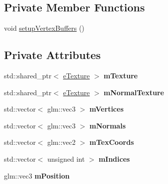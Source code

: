 \subsection*{Private Member Functions}
\begin{DoxyCompactItemize}
\item 
void \hyperlink{class_patch_a707359ae572413835eed30aa581b4303}{setup\+Vertex\+Buffers} ()
\end{DoxyCompactItemize}
\subsection*{Private Attributes}
\begin{DoxyCompactItemize}
\item 
std\+::shared\+\_\+ptr$<$ \hyperlink{classe_texture}{e\+Texture} $>$ {\bfseries m\+Texture}\hypertarget{class_patch_a448c010ef227400a0c920eba2ceaaa6a}{}\label{class_patch_a448c010ef227400a0c920eba2ceaaa6a}

\item 
std\+::shared\+\_\+ptr$<$ \hyperlink{classe_texture}{e\+Texture} $>$ {\bfseries m\+Normal\+Texture}\hypertarget{class_patch_a858af6054b09d30e12f60dfb3d4d37ce}{}\label{class_patch_a858af6054b09d30e12f60dfb3d4d37ce}

\item 
std\+::vector$<$ glm\+::vec3 $>$ {\bfseries m\+Vertices}\hypertarget{class_patch_a91394b023be10f88bf2a0d859cfb2658}{}\label{class_patch_a91394b023be10f88bf2a0d859cfb2658}

\item 
std\+::vector$<$ glm\+::vec3 $>$ {\bfseries m\+Normals}\hypertarget{class_patch_a2c4a284c887f9b53e2421bd528b7f1a1}{}\label{class_patch_a2c4a284c887f9b53e2421bd528b7f1a1}

\item 
std\+::vector$<$ glm\+::vec2 $>$ {\bfseries m\+Tex\+Coords}\hypertarget{class_patch_ae1e2c42f6f536d30cff72ebff76d6a6e}{}\label{class_patch_ae1e2c42f6f536d30cff72ebff76d6a6e}

\item 
std\+::vector$<$ unsigned int $>$ {\bfseries m\+Indices}\hypertarget{class_patch_a1b45d376a90ccfec624d6180d4edfcc0}{}\label{class_patch_a1b45d376a90ccfec624d6180d4edfcc0}

\item 
glm\+::vec3 {\bfseries m\+Position}\hypertarget{class_patch_a5c8e649806469a8e32ebae1bda2ae3c6}{}\label{class_patch_a5c8e649806469a8e32ebae1bda2ae3c6}


\end{DoxyCompactItemize}
